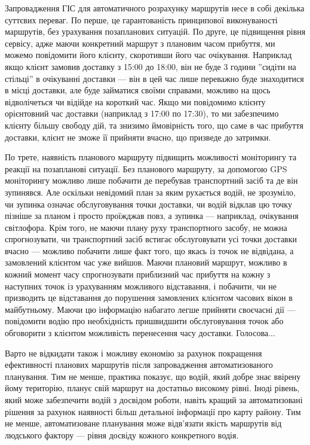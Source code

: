 Запровадження ГІС для автоматичного розрахунку маршрутів несе в собі декілька суттєвих переваг. По перше, це гарантованість принципової виконуваності маршрутів, без урахування позапланових ситуацій. По друге, це підвищення рівня сервісу, адже маючи конкретний маршрут з плановим часом прибуття, ми можемо повідомити його клієнту, скоротивши його час очікування. Наприклад якщо клієнт замовив доставку з 15:00 до 18:00, він не буде 3 години ”сидіти на стільці” в очікуванні доставки — він в цей час лише переважно буде знаходитися в місці доставки, але буде займатися своїми справами, можливо на щось відволічеться чи відійде на короткий час. Якщо ми повідомимо клієнту орієнтовний час доставки (наприклад з 17:00 по 17:30), то ми забезпечимо клієнту більшу свободу дій, та знизимо ймовірність того, що саме в час прибуття доставки, клієнт не зможе її прийняти вчасно, що призведе до затримки.

По трете, наявність планового маршруту підвищить можливості моніторингу та реакції на позапланові ситуації. Без планового маршруту, за допомогою GPS моніторингу можливо лише побачити де перебував транспортний засіб та де він зупинявся. Але оскільки невідомий план за яким рухається водій, не зрозуміло, чи зупинка означає обслуговування точки доставки, чи водій відклав цю точку пізніше за планом і просто проїжджав повз, а зупинка — наприклад, очікування світлофора. Крім того, не маючи плану руху транспортного засобу, не можна спрогнозувати, чи транспортний засіб встигає обслуговувати усі точки доставки вчасно — можливо побачити лише факт того, що якась із точок не відвідана, а замовлений клієнтом час уже вийшов. Маючи плановий маршрут, можливо в кожний момент часу спрогнозувати приблизний час прибуття на кожну з наступних точок із урахуванням можливого відставання, і побачити, чи не призводить це відставання до порушення замовлених клієнтом часових вікон в майбутньому. Маючи цю інформацію набагато легше прийняти своєчасні дії — повідомити водію про необхідність пришвидшити обслуговування точок або обговорити з клієнтом можливість перенесення часу доставки. Голосова...

Варто не відкидати також і можливу економію за рахунок покращення ефективності планових маршрутів після запровадження автоматизованого планування. Тим не менше, практика показує, що водій, який добре знає ввірену йому територію, планує свій маршрут на достатньо високому рівні. Іноді рівень, який може забезпечити водій з досвідом роботи, навіть кращий за автоматизовані рішення за рахунок наявності більш детальної інформації про карту району. Тим не менше, автоматизоване планування може відв’язати якість маршрутів від людського фактору — рівня досвіду кожного конкретного водія.

